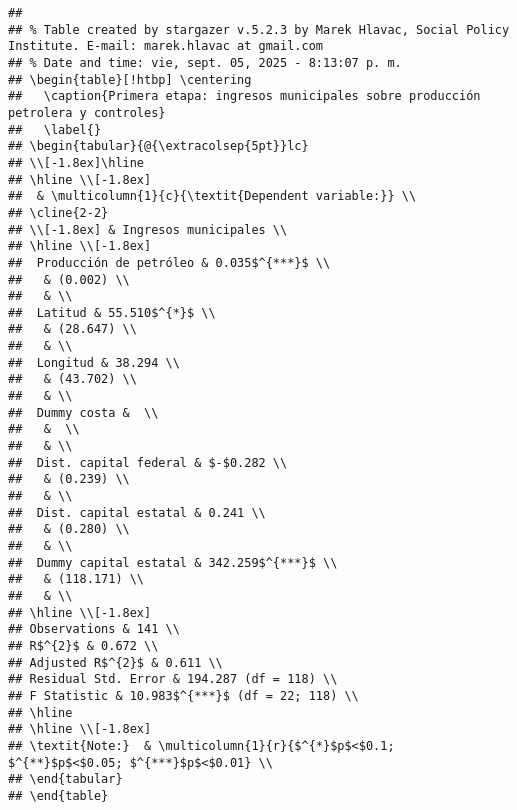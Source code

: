 \documentclass[
]{article}
\begin{document}
\begin{verbatim}
## 
## % Table created by stargazer v.5.2.3 by Marek Hlavac, Social Policy Institute. E-mail: marek.hlavac at gmail.com
## % Date and time: vie, sept. 05, 2025 - 8:13:07 p. m.
## \begin{table}[!htbp] \centering 
##   \caption{Primera etapa: ingresos municipales sobre producción petrolera y controles} 
##   \label{} 
## \begin{tabular}{@{\extracolsep{5pt}}lc} 
## \\[-1.8ex]\hline 
## \hline \\[-1.8ex] 
##  & \multicolumn{1}{c}{\textit{Dependent variable:}} \\ 
## \cline{2-2} 
## \\[-1.8ex] & Ingresos municipales \\ 
## \hline \\[-1.8ex] 
##  Producción de petróleo & 0.035$^{***}$ \\ 
##   & (0.002) \\ 
##   & \\ 
##  Latitud & 55.510$^{*}$ \\ 
##   & (28.647) \\ 
##   & \\ 
##  Longitud & 38.294 \\ 
##   & (43.702) \\ 
##   & \\ 
##  Dummy costa &  \\ 
##   &  \\ 
##   & \\ 
##  Dist. capital federal & $-$0.282 \\ 
##   & (0.239) \\ 
##   & \\ 
##  Dist. capital estatal & 0.241 \\ 
##   & (0.280) \\ 
##   & \\ 
##  Dummy capital estatal & 342.259$^{***}$ \\ 
##   & (118.171) \\ 
##   & \\ 
## \hline \\[-1.8ex] 
## Observations & 141 \\ 
## R$^{2}$ & 0.672 \\ 
## Adjusted R$^{2}$ & 0.611 \\ 
## Residual Std. Error & 194.287 (df = 118) \\ 
## F Statistic & 10.983$^{***}$ (df = 22; 118) \\ 
## \hline 
## \hline \\[-1.8ex] 
## \textit{Note:}  & \multicolumn{1}{r}{$^{*}$p$<$0.1; $^{**}$p$<$0.05; $^{***}$p$<$0.01} \\ 
## \end{tabular} 
## \end{table}
\end{verbatim}
\end{document}
